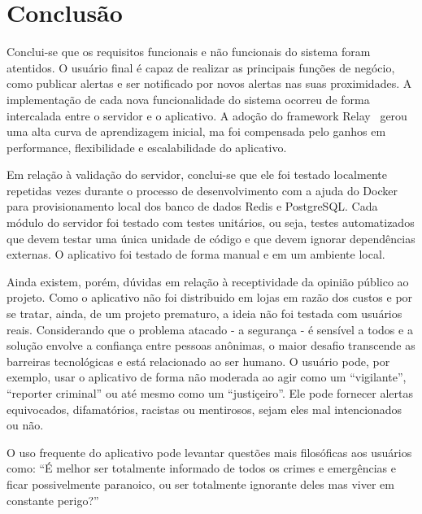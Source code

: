 \chapter{Conclusão}

Conclui-se que os requisitos funcionais e não funcionais do sistema foram atentidos. O usuário final é capaz de realizar as principais funções de negócio, como publicar alertas e ser notificado por novos alertas nas suas proximidades. A implementação de cada nova funcionalidade do sistema ocorreu de forma intercalada entre o servidor e o aplicativo. A adoção do framework Relay~\cite{relay} gerou uma alta curva de aprendizagem inicial, ma foi compensada pelo ganhos em performance, flexibilidade e escalabilidade do aplicativo.

Em relação à validação do servidor, conclui-se que ele foi testado localmente repetidas vezes durante o processo de desenvolvimento com a ajuda do Docker~\cite{docker} para provisionamento local dos banco de dados Redis e PostgreSQL. Cada módulo do servidor foi testado com testes unitários, ou seja, testes automatizados que devem testar uma única unidade de código e que devem ignorar dependências externas. O aplicativo foi testado de forma manual e em um ambiente local.

Ainda existem, porém, dúvidas em relação à receptividade da opinião público ao projeto. Como o aplicativo não foi distribuido em lojas em razão dos custos e por se tratar, ainda, de um projeto prematuro, a ideia não foi testada com usuários reais. Considerando que o problema atacado - a segurança - é sensível a todos e a solução envolve a confiança entre pessoas anônimas, o maior desafio transcende as barreiras tecnológicas e está relacionado ao ser humano. O usuário pode, por exemplo, usar o aplicativo de forma não moderada ao agir como um ``vigilante'', ``reporter criminal'' ou até mesmo como um ``justiçeiro''. Ele pode fornecer alertas equivocados, difamatórios, racistas ou mentirosos, sejam eles mal intencionados ou não.

O uso frequente do aplicativo pode levantar questões mais filosóficas aos usuários como: ``É melhor ser totalmente informado de todos os crimes e emergências e ficar possivelmente paranoico, ou ser totalmente ignorante deles mas viver em constante perigo?''
